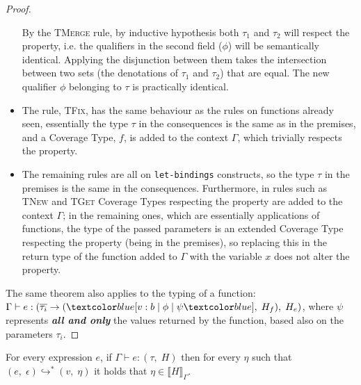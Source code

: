 \begin{proof}
\begin{itemize}
        By the \textsc{TMerge} rule, by inductive hypothesis both $\tau_1$ and $\tau_2$ will respect the property, i.e. the qualifiers in the second field ($\phi$) will be semantically identical. Applying the disjunction between them takes the intersection between two sets (the denotations of $\tau_1$ and $\tau_2$) that are equal. The new qualifier $\phi$ belonging to $\tau$ is practically identical.
        \item The rule, \textsc{TFix}, has the same behaviour as the rules on functions already seen, essentially the type $\tau$ in the consequences is the same as in the premises, and a Coverage Type, $f$, is added to the context $\Gamma$, which trivially respects the property.
        \item The remaining rules are all on \verb|let-bindings| constructs, so the type $\tau$ in the premises is the same in the consequences. Furthermore, in rules such as \textsc{TNew} and \textsc{TGet} Coverage Types respecting the property are added to the context $\Gamma$; in the remaining ones, which are essentially applications of functions, the type of the passed parameters is an extended Coverage Type respecting the property (being in the premises), so replacing this in the return type of the function added to $\Gamma$ with the variable $x$ does not alter the property.
    \end{itemize}

    The same theorem also applies to the typing of a function: $\Gamma \vdash e : (\overline{\tau_i} \rightarrow (\under{v: b \;|\; \phi \;|\; \psi}, \;H_f), \;H_e)$, where $\psi$ represents \emph{\textbf{all and only}} the values returned by the function, based also on the parameters $\tau_i$.
\end{proof}

\begin{theorem}
    For every expression $e$, if $\Gamma \vdash e : (\tau, \;H)$ then for every $\eta$ such that $(e, \;\epsilon) \hookrightarrow^* (v, \;\eta)$ it holds that $\eta \in \llbracket H \rrbracket_{\Gamma}$.
\end{theorem}

